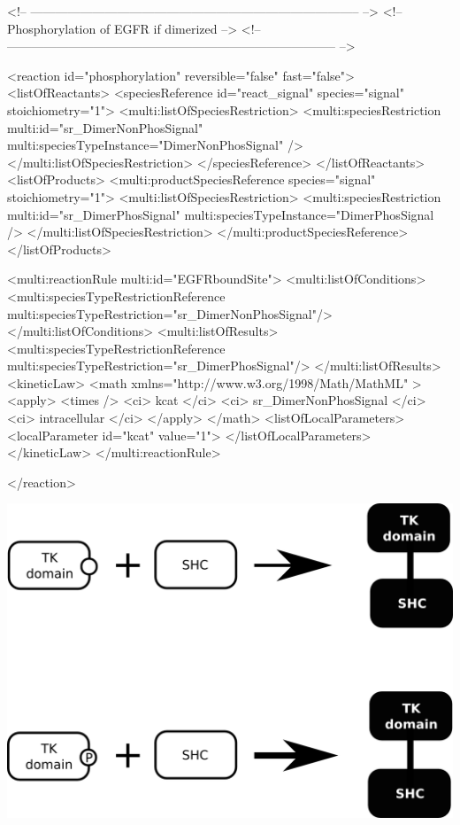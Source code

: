\begin{example}
<!-- -------------------------------------------------------------------------------- -->
<!-- Phosphorylation of EGFR if dimerized                                             -->
<!-- -------------------------------------------------------------------------------- -->

       <reaction id="phosphorylation" reversible="false" fast="false"> 
        <listOfReactants>
          <speciesReference id="react_signal" species="signal" stoichiometry="1">
            <multi:listOfSpeciesRestriction>
              <multi:speciesRestriction multi:id="sr_DimerNonPhosSignal" 
                                        multi:speciesTypeInstance="DimerNonPhosSignal" />
            </multi:listOfSpeciesRestriction>
          </speciesReference>
        </listOfReactants>
        <listOfProducts>
          <multi:productSpeciesReference species="signal" stoichiometry="1">
            <multi:listOfSpeciesRestriction>
              <multi:speciesRestriction multi:id="sr_DimerPhosSignal" 
                                        multi:speciesTypeInstance="DimerPhosSignal />
            </multi:listOfSpeciesRestriction>
          </multi:productSpeciesReference>
        </listOfProducts>

        <multi:reactionRule multi:id="EGFRboundSite">
          <multi:listOfConditions>
            <multi:speciesTypeRestrictionReference multi:speciesTypeRestriction="sr_DimerNonPhosSignal"/>
          </multi:listOfConditions>
          <multi:listOfResults>
            <multi:speciesTypeRestrictionReference multi:speciesTypeRestriction="sr_DimerPhosSignal"/>
          </multi:listOfResults>
            <kineticLaw>
              <math xmlns="http://www.w3.org/1998/Math/MathML" >
                <apply>
                  <times />
                  <ci> kcat </ci>
                  <ci> sr_DimerNonPhosSignal </ci>
                  <ci> intracellular </ci>
                </apply>
              </math>
              <listOfLocalParameters>
                <localParameter id="kcat" value="1">
              </listOfLocalParameters>
            </kineticLaw>
          </multi:reactionRule>

      </reaction>
\end{example}

\includegraphics[scale=0.9]{figs/pngs/SHCbinding.png}


